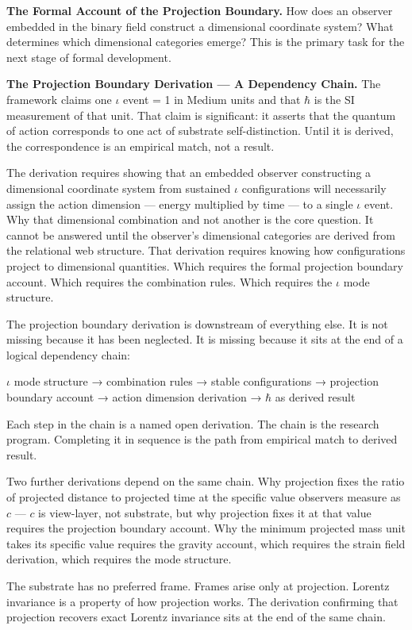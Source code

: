 \documentclass[11pt,letterpaper]{article}
\begin{document}
\textbf{The Formal Account of the Projection Boundary.} How does an observer embedded in the binary field construct a dimensional coordinate system? What determines which dimensional categories emerge? This is the primary task for the next stage of formal development.

\textbf{The Projection Boundary Derivation --- A Dependency Chain.} The framework claims one \(\iota\) event = 1 in Medium units and that \(\hbar\) is the SI measurement of that unit. That claim is significant: it asserts that the quantum of action corresponds to one act of substrate self-distinction. Until it is derived, the correspondence is an empirical match, not a result.

The derivation requires showing that an embedded observer constructing a dimensional coordinate system from sustained \(\iota\) configurations will necessarily assign the action dimension --- energy multiplied by time --- to a single \(\iota\) event. Why that dimensional combination and not another is the core question. It cannot be answered until the observer's dimensional categories are derived from the relational web structure. That derivation requires knowing how configurations project to dimensional quantities. Which requires the formal projection boundary account. Which requires the combination rules. Which requires the \(\iota\) mode structure.

The projection boundary derivation is downstream of everything else. It is not missing because it has been neglected. It is missing because it sits at the end of a logical dependency chain:

\(\iota\) mode structure → combination rules → stable configurations → projection boundary account → action dimension derivation → \(\hbar\) as derived result

Each step in the chain is a named open derivation. The chain is the research program. Completing it in sequence is the path from empirical match to derived result.

Two further derivations depend on the same chain. Why projection fixes the ratio of projected distance to projected time at the specific value observers measure as \(c\) --- \(c\) is view-layer, not substrate, but why projection fixes it at that value requires the projection boundary account. Why the minimum projected mass unit takes its specific value requires the gravity account, which requires the strain field derivation, which requires the mode structure.

The substrate has no preferred frame. Frames arise only at projection. Lorentz invariance is a property of how projection works. The derivation confirming that projection recovers exact Lorentz invariance sits at the end of the same chain.
\end{document}
